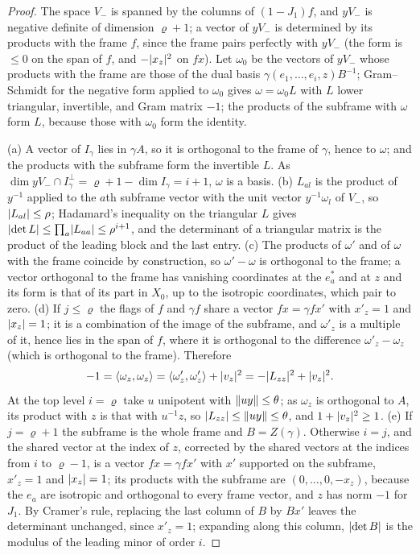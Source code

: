 \begin{proof}
The space $V_-$ is spanned by the columns of $(1-J_1)f$, and $yV_-$ is negative definite of dimension $\varrho+1$; a vector of $yV_-$ is determined by its products with the frame $f$, since the frame pairs perfectly
with $yV_-$ (the form is $\le0$ on the span of $f$, and $-\lvert x_z\rvert^2$ on $fx$). Let $\omega_0$ be the vectors of $yV_-$ whose products with the frame are those of the dual basis
$\gamma(e_1,\dots,e_i,z)B^{-1}$; Gram--Schmidt for the negative form applied to $\omega_0$ gives $\omega=\omega_0L$ with $L$ lower triangular, invertible, and Gram matrix $-1$; the products of the subframe with
$\omega$ form $L$, because those with $\omega_0$ form the identity.

(a) A vector of $I_\gamma$ lies in $\gamma A$, so it is orthogonal to the frame of $\gamma$, hence to $\omega$; and the products with the subframe form the invertible $L$. As $\dim yV_-\cap I_\gamma^\perp=\varrho+1-\dim I_\gamma=i+1$,
$\omega$ is a basis. (b) $L_{al}$ is the product of $y^{-1}$ applied to the $a$th subframe vector with the unit vector $y^{-1}\omega_l$ of $V_-$, so $\lvert L_{al}\rvert\le\rho$; Hadamard's inequality on the triangular $L$ gives
$\lvert \det L\rvert\le\prod_a\lvert L_{aa}\rvert\le\rho^{i+1}$, and the determinant of a triangular matrix is the product of the leading block and the last entry.
(c) The products of $\omega'$ and of $\omega$ with the frame coincide by construction, so $\omega'-\omega$ is orthogonal to the frame; a vector orthogonal to the frame has vanishing coordinates at the $e^*_a$
and at $z$ and its form is that of its part in $X_0$, up to the isotropic coordinates, which pair to zero.
(d) If $j\le\varrho$ the flags of $f$ and $\gamma f$ share a vector $fx=\gamma f x'$ with $x'_z=1$ and $\lvert x_z\rvert=1$; it is a combination of the image of the subframe, and $\omega'_z$ is a multiple of it, hence lies in the span of
$f$, where it is orthogonal to the difference $\omega'_z-\omega_z$ (which is orthogonal to the frame). Therefore
\[
  -1=\langle\omega_z,\omega_z\rangle=\langle\omega'_z,\omega'_z\rangle+\lvert v_z\rvert^2=-\lvert L_{zz}\rvert^2+\lvert v_z\rvert^2.
\]
At the top level $i=\varrho$ take $u$ unipotent with $\lVert uy\rVert\le\theta$; as $\omega_z$ is orthogonal to $A$, its product with $z$ is that with $u^{-1}z$, so $\lvert L_{zz}\rvert\le\lVert uy\rVert\le\theta$, and $1+\lvert v_z\rvert^2\ge1$.
(e) If $j=\varrho+1$ the subframe is the whole frame and $B=Z(\gamma)$. Otherwise $i=j$, and the shared vector at the index of $z$, corrected by the shared vectors at the indices from $i$ to $\varrho-1$, is a vector
$fx=\gamma fx'$ with $x'$ supported on the subframe, $x'_z=1$ and $\lvert x_z\rvert=1$; its products with the subframe are $(0,\dots,0,-x_z)$, because the $e_a$ are isotropic and orthogonal to every frame vector, and $z$ has norm $-1$
for $J_1$. By Cramer's rule, replacing the last column of $B$ by $Bx'$ leaves the determinant unchanged, since $x'_z=1$; expanding along this column, $\lvert \det B\rvert$ is the modulus of the leading
minor of order $i$.
\end{proof}

